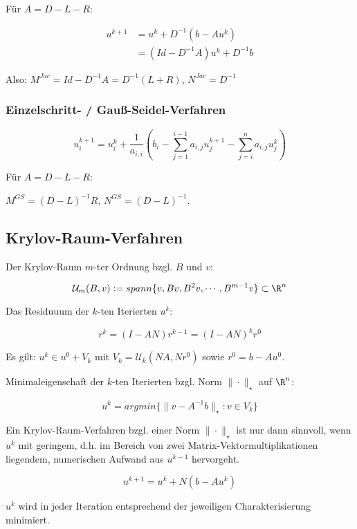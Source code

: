 Für $A = D - L - R$:

\vspace{-4mm}
\begin{align*}
	u^{k+1} &= u^k + D^{-1}(b-Au^k) \\
	        &= (Id - D^{-1}A)u^k + D^{-1}b
\end{align*}

Also: $M^{Jac} = Id - D^{-1}A = D^{-1}(L+R)$, $N^{Jac} = D^{-1}$

\subsubsection*{Einzelschritt- / Gauß-Seidel-Verfahren}

$$u_i^{k+1} = u_i^k + \frac{1}{a_{i,i}}\left(b_i - \sum_{j=1}^{i-1} a_{i,j} u_j^{k+1} - \sum_{j=i}^n a_{i,j} u_j^k \right)$$

Für $A = D - L - R$:

$M^{GS} = (D - L)^{-1}R$, $N^{GS} = (D - L)^{-1}$.

\subsection*{Krylov-Raum-Verfahren}

Der Krylov-Raum $m$-ter Ordnung bzgl. $B$ und $v$:

\vspace{-4mm}
$$\mathcal{U}_m(B,v) := spann\{v,Bv,B^2v, \cdots, B^{m-1}v\} \subset \R^n$$

Das Residuuum der $k$-ten Iterierten $u^k$:

\vspace{-2mm}
$$r^k=(I-AN)r^{k-1} = (I-AN)^kr^0$$

Es gilt: $u^k \in u^0 + V_k$ mit $V_k = \mathcal{U}_k(NA,Nr^0)$ sowie $r^0 = b - Au^0$.

Minimaleigenschaft der $k$-ten Iterierten bzgl. Norm $\|\cdot\|_\star$ auf $\R^n$:

\vspace{-2mm}
$$u^k = argmin\{\|v - A^{-1}b\|_\star : v \in V_k\}$$

Ein Krylov-Raum-Verfahren bzgl. einer Norm $\|\cdot\|_\star$ ist nur dann sinnvoll, wenn $u^k$ mit geringem, d.h. im Bereich von zwei Matrix-Vektormultiplikationen liegendem, numerischen Aufwand aus $u^{k-1}$ hervorgeht.

\vspace{-2mm}
$$u^{k+1} = u^k + N(b-Au^k)$$

$u^k$ wird in jeder Iteration entsprechend der jeweiligen Charakterisierung minimiert.

